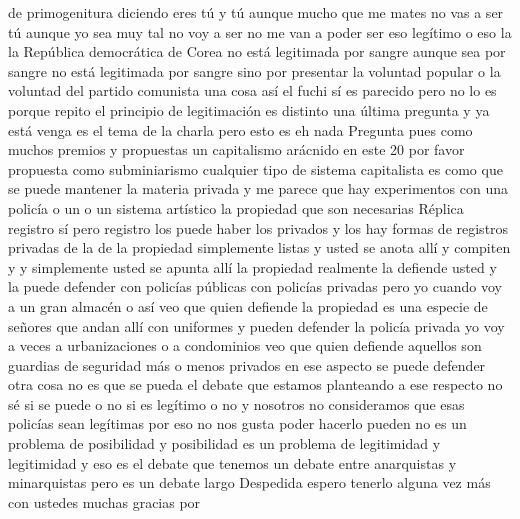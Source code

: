 de primogenitura diciendo eres tú y tú aunque mucho que me mates no vas a ser tú
aunque yo sea muy tal no voy a ser no me van a poder ser eso legítimo o eso la la República democrática de Corea
no está legitimada por sangre aunque sea por sangre no está legitimada por sangre sino por presentar la voluntad popular
o la voluntad del partido comunista una cosa así el fuchi sí
es parecido pero no lo es porque repito el principio de legitimación es distinto
una última pregunta y ya está venga es el tema de la charla pero esto es eh nada
Pregunta
pues como muchos premios y propuestas un capitalismo arácnido en este 20 por favor propuesta como subminiarismo
cualquier tipo de sistema capitalista es como que se puede mantener la materia privada
y me parece que hay experimentos con una policía o un o un sistema artístico la propiedad que son necesarias
Réplica
registro sí pero registro los puede haber los privados y los hay formas de registros privadas de la de la propiedad
simplemente listas y usted se anota allí y compiten y y simplemente usted se apunta allí
la propiedad realmente la defiende usted y la puede defender con policías públicas con policías privadas
pero yo cuando voy a un gran almacén o así veo que quien defiende la propiedad es una especie de señores que andan allí con uniformes y pueden defender la policía privada
yo voy a veces a urbanizaciones o a condominios veo que quien defiende aquellos son guardias de seguridad
más o menos privados en ese aspecto se puede defender otra cosa no es que se pueda
el debate que estamos planteando a ese respecto no sé si se puede o no si es legítimo o no y nosotros
no consideramos que esas policías sean legítimas por eso no nos gusta poder hacerlo pueden no es un problema de posibilidad y posibilidad
es un problema de legitimidad y legitimidad y eso es el debate que tenemos un debate entre anarquistas y minarquistas pero es un debate largo
Despedida
espero tenerlo alguna vez más con ustedes muchas gracias por

